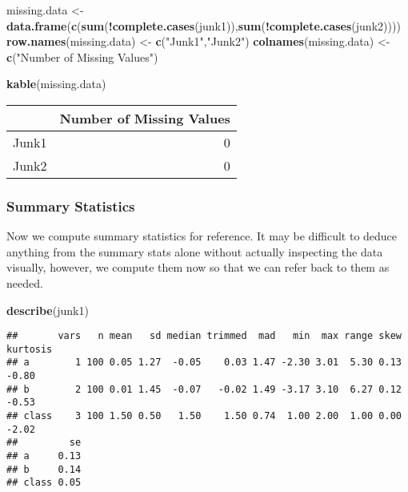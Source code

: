\documentclass[]{article}
\newenvironment{Shaded}{\begin{snugshade}}{\end{snugshade}}
\newcommand{\KeywordTok}[1]{\textcolor[rgb]{0.13,0.29,0.53}{\textbf{#1}}}
\newcommand{\StringTok}[1]{\textcolor[rgb]{0.31,0.60,0.02}{#1}}
\newcommand{\OperatorTok}[1]{\textcolor[rgb]{0.81,0.36,0.00}{\textbf{#1}}}
\newcommand{\NormalTok}[1]{#1}
\begin{document}
\begin{Shaded}
\begin{Highlighting}[]
\NormalTok{missing.data <-}\StringTok{ }\KeywordTok{data.frame}\NormalTok{(}\KeywordTok{c}\NormalTok{(}\KeywordTok{sum}\NormalTok{(}\OperatorTok{!}\KeywordTok{complete.cases}\NormalTok{(junk1)),}\KeywordTok{sum}\NormalTok{(}\OperatorTok{!}\KeywordTok{complete.cases}\NormalTok{(junk2))))}
\KeywordTok{row.names}\NormalTok{(missing.data) <-}\StringTok{ }\KeywordTok{c}\NormalTok{(}\StringTok{"Junk1"}\NormalTok{,}\StringTok{"Junk2"}\NormalTok{)}
\KeywordTok{colnames}\NormalTok{(missing.data) <-}\StringTok{ }\KeywordTok{c}\NormalTok{(}\StringTok{"Number of Missing Values"}\NormalTok{)}

\KeywordTok{kable}\NormalTok{(missing.data)}
\end{Highlighting}
\end{Shaded}

\begin{longtable}[]{@{}lr@{}}
\toprule
& Number of Missing Values\tabularnewline
\midrule
\endhead
Junk1 & 0\tabularnewline
Junk2 & 0\tabularnewline
\bottomrule
\end{longtable}

\subsubsection{Summary Statistics}\label{summary-statistics}

Now we compute summary statistics for reference. It may be difficult to
deduce anything from the summary stats alone without actually inspecting
the data visually, however, we compute them now so that we can refer
back to them as needed.

\begin{Shaded}
\begin{Highlighting}[]
\KeywordTok{describe}\NormalTok{(junk1)}
\end{Highlighting}
\end{Shaded}

\begin{verbatim}
##       vars   n mean   sd median trimmed  mad   min  max range skew kurtosis
## a        1 100 0.05 1.27  -0.05    0.03 1.47 -2.30 3.01  5.30 0.13    -0.80
## b        2 100 0.01 1.45  -0.07   -0.02 1.49 -3.17 3.10  6.27 0.12    -0.53
## class    3 100 1.50 0.50   1.50    1.50 0.74  1.00 2.00  1.00 0.00    -2.02
##         se
## a     0.13
## b     0.14
## class 0.05
\end{verbatim}
\end{document}
